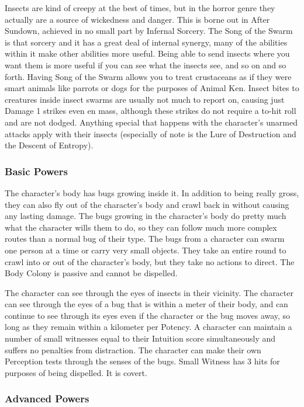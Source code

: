 Insects are kind of creepy at the best of times, but in the horror genre they actually are a source of wickedness and danger. This is borne out in After Sundown, achieved in no small part by Infernal Sorcery. The Song of the Swarm is that sorcery and it has a great deal of internal synergy, many of the abilities within it make other abilities more useful. Being able to send insects where you want them is more useful if you can see what the insects see, and so on and so forth. Having Song of the Swarm allows you to treat crustaceans as if they were smart animals like parrots or dogs for the purposes of Animal Ken. Insect bites to creatures inside insect swarms are usually not much to report on, causing just Damage 1 strikes even en mass, although these strikes do not require a to-hit roll and are not dodged. Anything special that happens with the character's unarmed attacks apply with their insects (especially of note is the Lure of Destruction and the Descent of Entropy).

\subsubsection{Basic Powers}

 The character's body has bugs growing inside it. In addition to being really gross, they can also fly out of the character's body and crawl back in without causing any lasting damage. The bugs growing in the character's body do pretty much what the character wills them to do, so they can follow much more complex routes than a normal bug of their type. The bugs from a character can swarm one person at a time or carry very small objects. They take an entire round to crawl into or out of the character's body, but they take no actions to direct. The Body Colony is passive and cannot be dispelled.

 The character can see through the eyes of insects in their vicinity. The character can see through the eyes of a bug that is within a meter of their body, and can continue to see through its eyes even if the character or the bug moves away, so long as they remain within a kilometer per Potency. A character can maintain a number of small witnesses equal to their Intuition score simultaneously and suffers no penalties from distraction. The character can make their own Perception tests through the senses of the bugs. Small Witness has 3 hits for purposes of being dispelled. It is covert.


\subsubsection{Advanced Powers}

